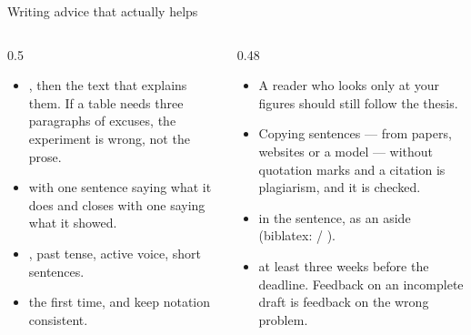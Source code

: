 \documentclass[aspectratio=169,11pt]{beamer}
\begin{document}
\begin{frame}{Writing advice that actually helps}
\begin{columns}[T]
\begin{column}{0.5\textwidth}
\footnotesize
\begin{itemize}
  \item {}, then the text that explains
        them. If a table needs three paragraphs of excuses, the experiment is
        wrong, not the prose.
  \item {} with one sentence saying what it does and
        closes with one saying what it showed.
  \item {}, past tense, active voice, short sentences.
  \item {} the first time, and keep notation consistent.
\end{itemize}
\end{column}
\begin{column}{0.48\textwidth}
\footnotesize
\begin{itemize}
  \item {} A reader who looks only at your
        figures should still follow the thesis.
  \item {} Copying sentences --- from
        papers, websites or a model --- without quotation marks and a citation
        is plagiarism, and it is checked.
  \item {}  in the
        sentence,  as an aside (biblatex:
         / ).
  \item {} at least three weeks before
        the deadline. Feedback on an incomplete draft is feedback on the wrong
        problem.
\end{itemize}
\end{column}
\end{columns}
\end{frame}
\end{document}
